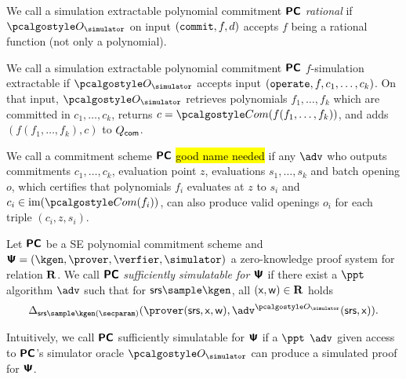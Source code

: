 \documentclass[runningheads,11pt]{llncs}
\begin{document}
 \begin{definition}
   \label{def:rational_sepcom}
   We call a simulation extractable polynomial commitment $\bm{\mathsf{PC}}$
   \emph{rational} if $\oracles$ on input $(\mathtt{commit}, f, d)$ accepts $f$
   being a rational function (not only a polynomial).
 \end{definition}

 \begin{definition}[$f$-SE PCOM]
   \label{def:f_sepcom}
   We call a simulation extractable polynomial commitment $\bm{\mathsf{PC}}$ $f$-simulation
   extractable if $\oracles$ accepts input
   $(\mathtt{operate}, f, c_1, \ldots, c_k)$. On that input, $\oracles$ retrieves
   polynomials $f_1, \ldots, f_k$ which are committed in $c_1, \ldots, c_k$, 
   returns $c = \com(f(f_1, \ldots, f_k))$, and adds $(f(f_1, \ldots, f_k), c)$
   to $Q_{\mathsf{com}}$.
 \end{definition}

 \begin{definition}
   We call a commitment scheme $\bm{\mathsf{PC}}$ \hl{good name needed} if any $\adv$ who
   outputs commitments $c_1, \ldots, c_k$, evaluation point $z$, evaluations
   $s_1, \ldots, s_k$ and batch opening $o$, which certifies that polynomials
   $f_i$ evaluates at $z$ to $s_i$ and $c_i \in \image(\com(f_i))$, can also
   produce valid openings $o_i$ for each triple $(c_i, z, s_i)$.
 \end{definition}

 \begin{definition}
   Let $\bm{\mathsf{PC}}$ be a SE polynomial commitment scheme and
   $\PS = (\kgen, \prover, \verfier, \simulator)$ a zero-knowledge proof system
   for relation $\mathbf{R}$. We call $\bm{\mathsf{PC}}$ \emph{sufficiently simulatable for
     $\bm{\mathsf{\Psi}}$} if there exist a $\ppt$ algorithm $\adv$ such that for
   $\srs \sample \kgen$, all $(\mathsf{x}, \mathsf{w}) \in \mathbf{R}$ holds
   \[
     \SD_{\srs \sample \kgen(\secparam)}(\prover(\srs, \inp, \wit),
     \adv^{\oracles}(\srs, \inp)).
   \]
 \end{definition}
 Intuitively, we call $\bm{\mathsf{PC}}$ sufficiently simulatable for $\bm{\mathsf{\Psi}}$ if a $\ppt$
 $\adv$ given access to $\bm{\mathsf{PC}}$'s simulator oracle $\oracles$ can produce a
 simulated proof for $\bm{\mathsf{\Psi}}$.
\end{document}
